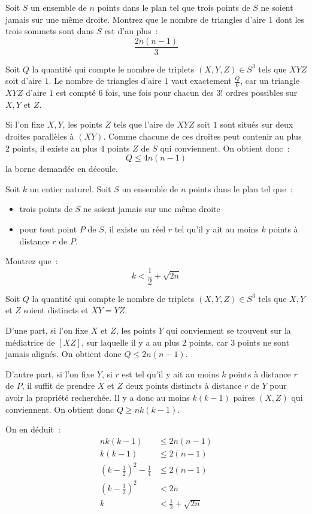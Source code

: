 \begin{exo}[Iran 2010]
	Soit $S$ un ensemble de $n$ points dans le plan tel que trois points de $S$ ne soient jamais sur une même droite.
	Montrez que le nombre de triangles d'aire $1$ dont les trois sommets sont dans $S$ est d'au plus~:
	$$\frac{2n(n - 1)}{3}$$
\end{exo}
\begin{sol}
	Soit $Q$ la quantité qui compte le nombre de triplets $(X, Y, Z) \in S^3$ tels que $XYZ$ soit d'aire $1$.
	Le nombre de triangles d'aire $1$ vaut exactement $\frac{Q}{6}$, car un triangle $XYZ$ d'aire $1$ est compté $6$ fois, une fois pour chacun des $3!$ ordres possibles sur $X, Y$ et $Z$.
	
	Si l'on fixe $X, Y$, les points $Z$ tels que l'aire de $XYZ$ soit $1$ sont situés sur deux droites parallèles à $(XY)$. Comme chacune de ces droites peut contenir au plus $2$ points, il existe au plus $4$ points $Z$ de $S$ qui conviennent.
	On obtient donc~:
	$$Q \leq 4n(n - 1)$$
	la borne demandée en découle.
\end{sol}

\begin{exo}[IMO 1987]
	Soit $k$ un entier naturel.
	Soit $S$ un ensemble de $n$ points dans le plan tel que~:
	\begin{itemize}
	\item trois points de $S$ ne soient jamais sur une même droite
	\item pour tout point $P$ de $S$, il existe un réel $r$ tel qu'il y ait au moins $k$ points à distance $r$ de $P$.
	\end{itemize}
	Montrez que~:
	$$k < \frac12 + \sqrt{2n}$$
\end{exo}
\begin{sol}
	Soit $Q$ la quantité qui compte le nombre de triplets $(X, Y, Z) \in S^3$ tels que $X, Y$ et $Z$ soient distincts et $XY = YZ$.
	
	D'une part, si l'on fixe $X$ et $Z$, les points $Y$ qui conviennent se trouvent sur la médiatrice de $[XZ]$, sur laquelle il y a au plus $2$ points, car $3$ points ne sont jamais alignés.
	On obtient donc $Q \leq 2n(n - 1)$.
	
	D'autre part, si l'on fixe $Y$, si $r$ est tel qu'il y ait au moins $k$ points à distance $r$ de $P$, il suffit de prendre $X$ et $Z$ deux points distincts à distance $r$ de $Y$ pour avoir la propriété recherchée. Il y a donc au moins $k(k - 1)$ paires $(X, Z)$ qui conviennent.
	On obtient donc $Q \geq nk(k - 1)$.
	
	On en déduit~:
	\begin{align*}
	nk(k - 1) & \leq 2n(n - 1) \\
	k(k - 1) & \leq 2(n - 1) \\
	(k - \frac12)^2 - \frac1{4} & \leq 2(n - 1) \\
	(k - \frac12)^2 & < 2n \\
	k & < \frac12 + \sqrt{2n}
	\end{align*}
\end{sol}

